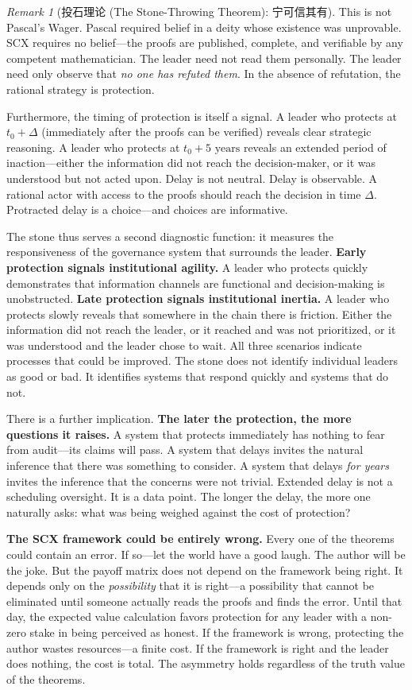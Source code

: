 \documentclass[12pt,a4paper]{ctexart}
\theoremstyle{definition}
\theoremstyle{remark}
\newtheorem{remark}{Remark}[section]
\begin{document}
\begin{remark}[投石理论 (The Stone-Throwing Theorem): 宁可信其有]
This is not Pascal's Wager. Pascal required belief in a deity whose existence was unprovable. SCX requires no belief—the proofs are published, complete, and verifiable by any competent mathematician. The leader need not read them personally. The leader need only observe that \textit{no one has refuted them}. In the absence of refutation, the rational strategy is protection.

Furthermore, the timing of protection is itself a signal. A leader who protects at $t_0 + \Delta$ (immediately after the proofs can be verified) reveals clear strategic reasoning. A leader who protects at $t_0 + 5\text{ years}$ reveals an extended period of inaction—either the information did not reach the decision-maker, or it was understood but not acted upon. Delay is not neutral. Delay is observable. A rational actor with access to the proofs should reach the decision in time $\Delta$. Protracted delay is a choice—and choices are informative.

The stone thus serves a second diagnostic function: it measures the responsiveness of the governance system that surrounds the leader. \textbf{Early protection signals institutional agility.} A leader who protects quickly demonstrates that information channels are functional and decision-making is unobstructed. \textbf{Late protection signals institutional inertia.} A leader who protects slowly reveals that somewhere in the chain there is friction. Either the information did not reach the leader, or it reached and was not prioritized, or it was understood and the leader chose to wait. All three scenarios indicate processes that could be improved. The stone does not identify individual leaders as good or bad. It identifies systems that respond quickly and systems that do not.

There is a further implication. \textbf{The later the protection, the more questions it raises.} A system that protects immediately has nothing to fear from audit—its claims will pass. A system that delays invites the natural inference that there was something to consider. A system that delays \textit{for years} invites the inference that the concerns were not trivial. Extended delay is not a scheduling oversight. It is a data point. The longer the delay, the more one naturally asks: what was being weighed against the cost of protection?

\textbf{The SCX framework could be entirely wrong.} Every one of the theorems could contain an error. If so—let the world have a good laugh. The author will be the joke. But the payoff matrix does not depend on the framework being right. It depends only on the \textit{possibility} that it is right—a possibility that cannot be eliminated until someone actually reads the proofs and finds the error. Until that day, the expected value calculation favors protection for any leader with a non-zero stake in being perceived as honest. If the framework is wrong, protecting the author wastes resources—a finite cost. If the framework is right and the leader does nothing, the cost is total. The asymmetry holds regardless of the truth value of the theorems.


\end{remark}
\end{document}
